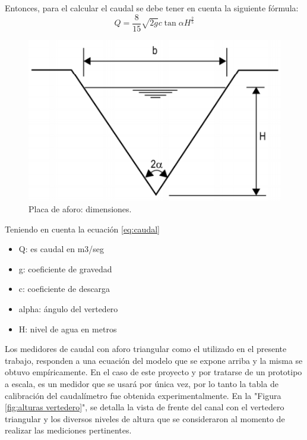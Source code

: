 Entonces, para el calcular el caudal se debe tener en cuenta la siguiente fórmula:
\begin{equation}
 \label{eq:caudal}
 Q = \frac{8}{15}\sqrt{2g} c \tan\alpha  H^\frac{2}{5} 
\end{equation}
	
\begin{figure}
\centering
\includegraphics[scale=.75]{./Figures/DimensionesPlacaAforo.png}
\caption{Placa de aforo: dimensiones.}
\label{fig:Placa de aforo dimensiones}
\end{figure}	

Teniendo en cuenta la ecuación \ref{eq:caudal}
\begin{itemize}
\item Q: es caudal en m3/seg
\item g: coeficiente de gravedad
\item c: coeficiente de descarga
\item alpha: ángulo del vertedero
\item H: nivel de agua en metros

\end{itemize}

Los medidores de caudal con aforo triangular como el utilizado en el presente trabajo, responden a una ecuación del modelo que se expone arriba y la misma se obtuvo empíricamente. En el caso de este proyecto y por tratarse de un prototipo a escala, es un medidor que se usará por única vez, por lo tanto la tabla de calibración del caudalímetro fue obtenida experimentalmente.  
En la "Figura \ref{fig:alturas vertedero}", se detalla la vista de frente del canal con el vertedero triangular y los diversos niveles de altura que se consideraron al momento de realizar las mediciones pertinentes. 

